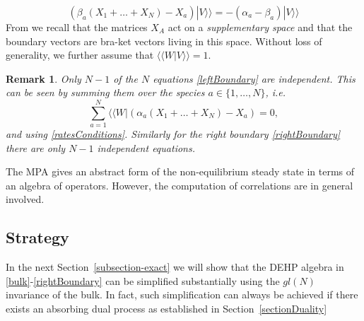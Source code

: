 \documentclass[10pt]{article}
\numberwithin{equation}{section}
\numberwithin{equation}{subsection}
\newtheorem{remark}{Remark}
\newcommand{\fra}[1]{\textcolor[rgb]{0,0,1}{#1}}
\begin{document}
\begin{equation}\label{rightBoundary}
	\left(\beta_{a}(X_{1}+\ldots+X_{N})-X_{a}\right) |V\rangle\rangle =-(\alpha_{a}-\beta_{a}) |V\rangle\rangle 
\end{equation}
\fra{From \cite{vanicat2017exact} we recall that the matrices $X_{A}$ act on a \textit{supplementary space} and that the boundary vectors are bra-ket vectors living in this space.}
Without loss of generality, we further assume that $ \langle \langle W|  V\rangle\rangle =1$. 
\begin{remark} Only $N-1$ of the $N$ equations \eqref{leftBoundary}  are independent. This can be seen by summing them over the species $a\in \{1,\ldots,N\}$, i.e.
	\begin{equation}
		\sum_{a=1}^{N}	 \langle \langle W|  \left(\alpha_{a}(X_{1}+\ldots+X_{N})-X_{a}\right)=0,
	\end{equation}
	and using  \eqref{ratesConditions}.
 Similarly for the right boundary  \eqref{rightBoundary} there are only  $N-1$ independent equations. \end{remark} 
The MPA gives an abstract form of the non-equilibrium steady state in terms of an algebra of operators. However, the computation of  correlations are in general involved. 

\subsection{Strategy}
 In the next Section~\ref{subsection-exact} we will show that the DEHP algebra in \eqref{bulk}-\eqref{rightBoundary} can be simplified substantially using the ${gl}(N)$ invariance of the bulk. In fact, such simplification can always be achieved if 
  there exists an absorbing dual process as established in Section~\ref{sectionDuality}
 
\end{document}
